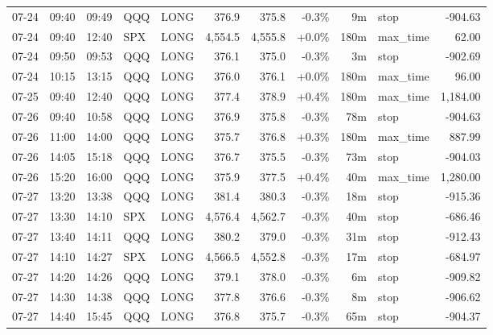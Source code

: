 \documentclass[11pt,a4paper,twoside]{article}
\begin{document}
\begin{center}
\begin{longtable}{>{\color{txtmain}}l l l l l r r r r >{\color{txtmain}}l r}
07-24 & 09:40 & 09:49 & QQQ & LONG & 376.9 & 375.8 & \textcolor{lossred}{-0.3\%} & 9m & stop & \textcolor{lossred}{-904.63} \\
07-24 & 09:40 & 12:40 & SPX & LONG & 4,554.5 & 4,555.8 & \textcolor{wingreen}{+0.0\%} & 180m & max\_time & \textcolor{wingreen}{62.00} \\
07-24 & 09:50 & 09:53 & QQQ & LONG & 376.1 & 375.0 & \textcolor{lossred}{-0.3\%} & 3m & stop & \textcolor{lossred}{-902.69} \\
07-24 & 10:15 & 13:15 & QQQ & LONG & 376.0 & 376.1 & \textcolor{wingreen}{+0.0\%} & 180m & max\_time & \textcolor{wingreen}{96.00} \\
07-25 & 09:40 & 12:40 & QQQ & LONG & 377.4 & 378.9 & \textcolor{wingreen}{+0.4\%} & 180m & max\_time & \textcolor{wingreen}{1,184.00} \\
07-26 & 09:40 & 10:58 & QQQ & LONG & 376.9 & 375.8 & \textcolor{lossred}{-0.3\%} & 78m & stop & \textcolor{lossred}{-904.63} \\
07-26 & 11:00 & 14:00 & QQQ & LONG & 375.7 & 376.8 & \textcolor{wingreen}{+0.3\%} & 180m & max\_time & \textcolor{wingreen}{887.99} \\
07-26 & 14:05 & 15:18 & QQQ & LONG & 376.7 & 375.5 & \textcolor{lossred}{-0.3\%} & 73m & stop & \textcolor{lossred}{-904.03} \\
07-26 & 15:20 & 16:00 & QQQ & LONG & 375.9 & 377.5 & \textcolor{wingreen}{+0.4\%} & 40m & max\_time & \textcolor{wingreen}{1,280.00} \\
07-27 & 13:20 & 13:38 & QQQ & LONG & 381.4 & 380.3 & \textcolor{lossred}{-0.3\%} & 18m & stop & \textcolor{lossred}{-915.36} \\
07-27 & 13:30 & 14:10 & SPX & LONG & 4,576.4 & 4,562.7 & \textcolor{lossred}{-0.3\%} & 40m & stop & \textcolor{lossred}{-686.46} \\
07-27 & 13:40 & 14:11 & QQQ & LONG & 380.2 & 379.0 & \textcolor{lossred}{-0.3\%} & 31m & stop & \textcolor{lossred}{-912.43} \\
07-27 & 14:10 & 14:27 & SPX & LONG & 4,566.5 & 4,552.8 & \textcolor{lossred}{-0.3\%} & 17m & stop & \textcolor{lossred}{-684.97} \\
07-27 & 14:20 & 14:26 & QQQ & LONG & 379.1 & 378.0 & \textcolor{lossred}{-0.3\%} & 6m & stop & \textcolor{lossred}{-909.82} \\
07-27 & 14:30 & 14:38 & QQQ & LONG & 377.8 & 376.6 & \textcolor{lossred}{-0.3\%} & 8m & stop & \textcolor{lossred}{-906.62} \\
07-27 & 14:40 & 15:45 & QQQ & LONG & 376.8 & 375.7 & \textcolor{lossred}{-0.3\%} & 65m & stop & \textcolor{lossred}{-904.37} \\

\end{longtable}
\end{center}
\end{document}
